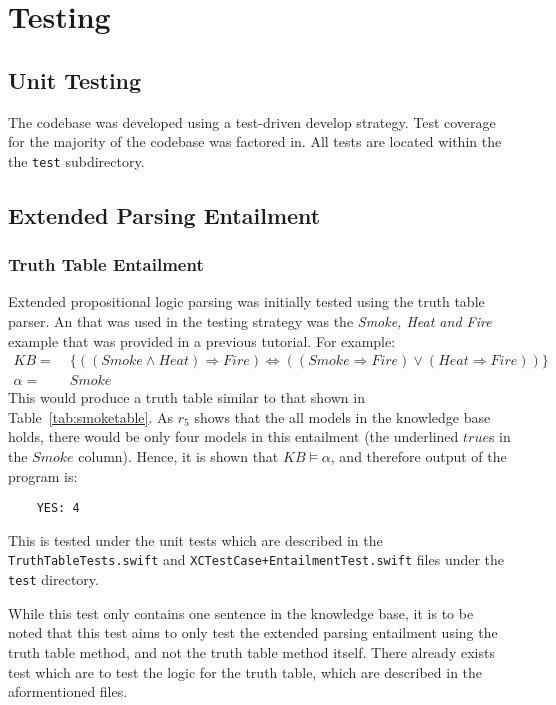 \section{Testing}
\label{sec:Testing}

\subsection{Unit Testing}
\label{sub:Unit Testing}

The codebase was developed using a test-driven develop strategy. Test coverage
for the majority of the codebase was factored in. All tests are located within
the the \texttt{test} subdirectory.

\subsection{Extended Parsing Entailment}
\label{sub:Extended Parsing Entailment}

\subsubsection{Truth Table Entailment}
\label{subs:Truth Table Entailment}

Extended propositional logic parsing was initially tested using the truth
table parser. An that was used in the testing strategy was the \emph{Smoke, Heat and Fire}
example that was provided in a previous tutorial. For example:
\begin{align*}
  KB     =& \; \{ ((Smoke \wedge Heat) \Rightarrow Fire) \Leftrightarrow ((Smoke \Rightarrow Fire) \vee (Heat \Rightarrow Fire)) \}\\
  \alpha =& \; Smoke
\end{align*}
This would produce a truth table similar to that shown in Table~\ref{tab:smoketable}.
As $r_{5}$ shows that the all models in the knowledge base holds, there would be
only four models in this entailment (the underlined $true$s in the $Smoke$ column).
Hence, it is shown that $KB \models \alpha$, and therefore output of the program is:

\begin{verbatim}
    YES: 4
\end{verbatim}

This is tested under the unit tests which are described in the
\texttt{TruthTableTests.swift} and \texttt{XCTestCase+EntailmentTest.swift}
files under the \texttt{test} directory.

While this test only contains one sentence in the knowledge base, it is to be
noted that this test aims to only test the extended parsing entailment using the
truth table method, and not the truth table method itself. There already exists
test which are to test the logic for the truth table, which are described in the
aformentioned files.

